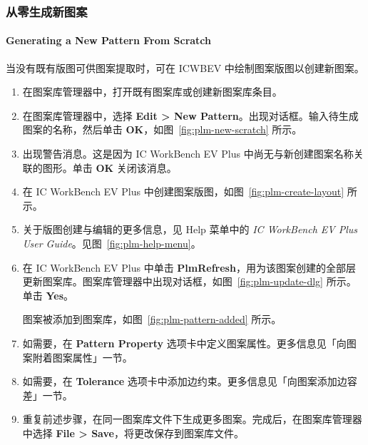 \subsubsection{从零生成新图案}
\paragraph*{Generating a New Pattern From Scratch}

当没有既有版图可供图案提取时，可在 ICWBEV 中绘制图案版图以创建新图案。

\begin{enumerate}
  \item 在图案库管理器中，打开既有图案库或创建新图案库条目。
  \item 在图案库管理器中，选择 \textbf{Edit > New Pattern}。出现对话框。输入待生成图案的名称，然后单击 \textbf{OK}，如图~\ref{fig:plm-new-scratch} 所示。


  \item 出现警告消息。这是因为 IC WorkBench EV Plus 中尚无与新创建图案名称关联的图形。单击 \textbf{OK} 关闭该消息。


  \item 在 IC WorkBench EV Plus 中创建图案版图，如图~\ref{fig:plm-create-layout} 所示。


  \item 关于版图创建与编辑的更多信息，见 Help 菜单中的 \textit{IC WorkBench EV Plus User Guide}。见图~\ref{fig:plm-help-menu}。


  \item 在 IC WorkBench EV Plus 中单击 \textbf{PlmRefresh}，用为该图案创建的全部层更新图案库。图案库管理器中出现对话框，如图~\ref{fig:plm-update-dlg} 所示。单击 \textbf{Yes}。


  图案被添加到图案库，如图~\ref{fig:plm-pattern-added} 所示。


  \item 如需要，在 \textbf{Pattern Property} 选项卡中定义图案属性。更多信息见「向图案附着图案属性」一节。
  \item 如需要，在 \textbf{Tolerance} 选项卡中添加边约束。更多信息见「向图案添加边容差」一节。
  \item 重复前述步骤，在同一图案库文件下生成更多图案。完成后，在图案库管理器中选择 \textbf{File > Save}，将更改保存到图案库文件。
\end{enumerate}

